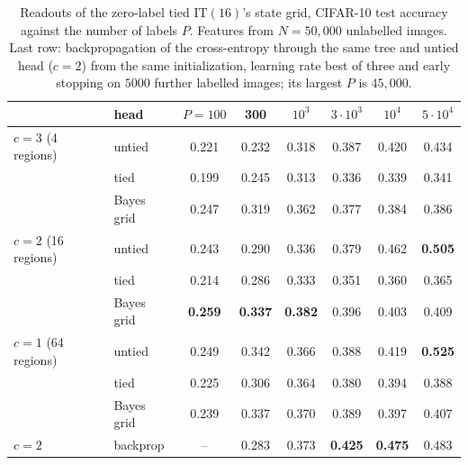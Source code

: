 \documentclass[11pt]{article}
\theoremstyle{definition}
\begin{document}
\begin{table}[h]\centering
\caption{Readouts of the zero-label tied $\mathrm{IT}(16)$'s state grid, CIFAR-10 test accuracy against the number of labels
$P$. Features from $N=50{,}000$ unlabelled images. Last row: backpropagation of the cross-entropy through the same tree and
untied head ($c=2$) from the same initialization, learning rate best of three and early stopping on $5000$ further labelled
images; its largest $P$ is $45{,}000$.}\label{tab:grid}
\small\begin{tabular}{ll|cccccc}\toprule
& head & $P=100$ & 300 & $10^3$ & $3\cdot10^3$ & $10^4$ & $5\cdot10^4$\\\midrule
$c=3$ (4 regions) & untied & 0.221 & 0.232 & 0.318 & 0.387 & 0.420 & 0.434\\
& tied & 0.199 & 0.245 & 0.313 & 0.336 & 0.339 & 0.341\\
& Bayes grid & 0.247 & 0.319 & 0.362 & 0.377 & 0.384 & 0.386\\\midrule
$c=2$ (16 regions) & untied & 0.243 & 0.290 & 0.336 & 0.379 & 0.462 & \textbf{0.505}\\
& tied & 0.214 & 0.286 & 0.333 & 0.351 & 0.360 & 0.365\\
& Bayes grid & \textbf{0.259} & \textbf{0.337} & \textbf{0.382} & 0.396 & 0.403 & 0.409\\\midrule
$c=1$ (64 regions) & untied & 0.249 & 0.342 & 0.366 & 0.388 & 0.419 & \textbf{0.525}\\
& tied & 0.225 & 0.306 & 0.364 & 0.380 & 0.394 & 0.388\\
& Bayes grid & 0.239 & 0.337 & 0.370 & 0.389 & 0.397 & 0.407\\\midrule
$c=2$ & backprop & -- & 0.283 & 0.373 & \textbf{0.425} & \textbf{0.475} & 0.483\\
\bottomrule\end{tabular}
\end{table}
\end{document}

